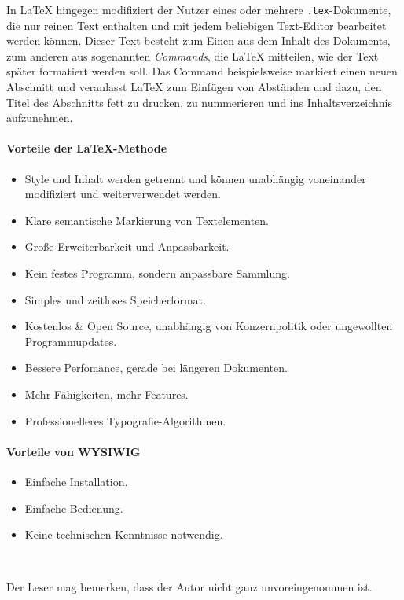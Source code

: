 In \LaTeX{} hingegen modifiziert der Nutzer eines oder mehrere \texttt{.tex}-Dokumente, die nur reinen Text enthalten und mit jedem beliebigen Text-Editor bearbeitet werden können.
Dieser Text besteht zum Einen aus dem Inhalt des Dokuments, zum anderen aus sogenannten \emph{Commands}, die \LaTeX{} mitteilen, wie der Text später formatiert werden soll. Das Command  beispielsweise markiert einen neuen Abschnitt und veranlasst \LaTeX{} zum Einfügen von Abständen und dazu, den Titel des Abschnitts fett zu drucken, zu nummerieren und ins Inhaltsverzeichnis aufzunehmen.


\paragraph{Vorteile der \LaTeX{}-Methode}
\begin{itemize}
	\item Style und Inhalt werden getrennt und können unabhängig voneinander modifiziert und weiterverwendet werden.
	\item Klare semantische Markierung von Textelementen.
	\item Große Erweiterbarkeit und Anpassbarkeit.
	\item Kein festes Programm, sondern anpassbare Sammlung.
	\item Simples und zeitloses Speicherformat.
	\item Kostenlos \& Open Source, unabhängig von Konzernpolitik oder ungewollten Programmupdates.
	\item Bessere Perfomance, gerade bei längeren Dokumenten.
	\item Mehr Fähigkeiten, mehr Features.
	\item Professionelleres Typografie-Algorithmen.
\end{itemize}

\paragraph{Vorteile von WYSIWIG}
\begin{itemize}
	\item Einfache Installation.
	\item Einfache Bedienung.
	\item Keine technischen Kenntnisse notwendig.
\end{itemize}

~

Der Leser mag bemerken, dass der Autor nicht ganz unvoreingenommen ist.

